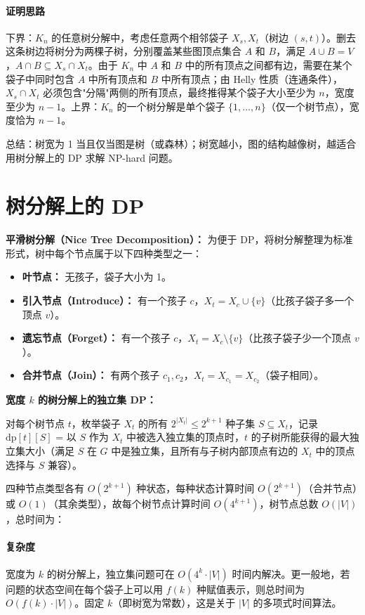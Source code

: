 \documentclass[UTF8,openany,12pt]{ctexbook}
\theoremstyle{remark}
\newcommand{\complexity}[1]{\paragraph{复杂度}#1}
\newcommand{\proofidea}[1]{\paragraph{证明思路}#1}
\newcommand{\NP}{\mathrm{NP}}
\begin{document}
\proofidea{下界：$K_n$ 的任意树分解中，考虑任意两个相邻袋子 $X_s, X_t$（树边 $(s,t)$）。删去这条树边将树分为两棵子树，分别覆盖某些图顶点集合 $A$ 和 $B$，满足 $A \cup B = V$，$A \cap B \subseteq X_s \cap X_t$。由于 $K_n$ 中 $A$ 和 $B$ 中的所有顶点之间都有边，需要在某个袋子中同时包含 $A$ 中所有顶点和 $B$ 中所有顶点；由 Helly 性质（连通条件），$X_s \cap X_t$ 必须包含"分隔"两侧的所有顶点，最终推得某个袋子大小至少为 $n$，宽度至少为 $n-1$。上界：$K_n$ 的一个树分解是单个袋子 $\{1,\ldots,n\}$（仅一个树节点），宽度恰为 $n-1$。}

总结：树宽为 1 当且仅当图是树（或森林）；树宽越小，图的结构越像树，越适合用树分解上的 DP 求解 $\NP$-hard 问题。

\section{树分解上的 DP}

\textbf{平滑树分解（Nice Tree Decomposition）：} 为便于 DP，将树分解整理为标准形式，树中每个节点属于以下四种类型之一：
\begin{itemize}
  \item \textbf{叶节点：} 无孩子，袋子大小为 1。
  \item \textbf{引入节点（Introduce）：} 有一个孩子 $c$，$X_t = X_c \cup \{v\}$（比孩子袋子多一个顶点 $v$）。
  \item \textbf{遗忘节点（Forget）：} 有一个孩子 $c$，$X_t = X_c \setminus \{v\}$（比孩子袋子少一个顶点 $v$）。
  \item \textbf{合并节点（Join）：} 有两个孩子 $c_1, c_2$，$X_t = X_{c_1} = X_{c_2}$（袋子相同）。
\end{itemize}

\textbf{宽度 $k$ 的树分解上的独立集 DP：}

对每个树节点 $t$，枚举袋子 $X_t$ 的所有 $2^{|X_t|} \leq 2^{k+1}$ 种子集 $S \subseteq X_t$，记录 $\mathrm{dp}[t][S]$ = 以 $S$ 作为 $X_t$ 中被选入独立集的顶点时，$t$ 的子树所能获得的最大独立集大小（满足 $S$ 在 $G$ 中是独立集，且所有与子树内部顶点有边的 $X_t$ 中的顶点选择与 $S$ 兼容）。

四种节点类型各有 $O(2^{k+1})$ 种状态，每种状态计算时间 $O(2^{k+1})$（合并节点）或 $O(1)$（其余类型），故每个树节点计算时间 $O(4^{k+1})$，树节点总数 $O(|V|)$，总时间为：

\complexity{宽度为 $k$ 的树分解上，独立集问题可在 $O(4^k \cdot |V|)$ 时间内解决。更一般地，若问题的状态空间在每个袋子上可以用 $f(k)$ 种赋值表示，则总时间为 $O(f(k) \cdot |V|)$。固定 $k$（即树宽为常数），这是关于 $|V|$ 的多项式时间算法。}
\end{document}
